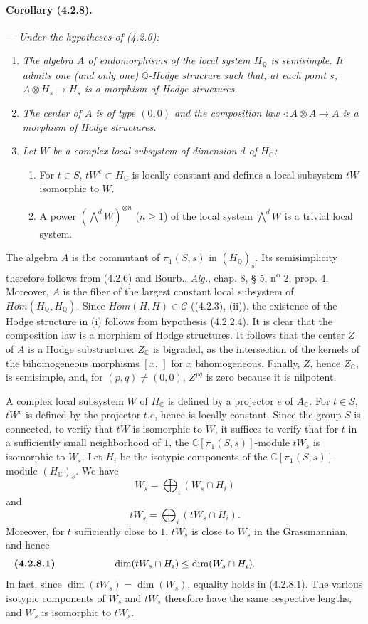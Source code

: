 \documentclass[10pt]{article}
\newcommand{\C}{\mathbb C}
\newcommand{\Q}{\mathbb Q}
\begin{document}
\paragraph{Corollary (4.2.8).} --- {\itshape Under the hypotheses of (4.2.6):}
\begin{enumerate}[label=(\roman*)]
\item {\itshape The algebra $A$ of endomorphisms of the local system $H_\Q$ is semisimple. It admits one (and only one) $\Q$-Hodge structure such that, at each point $s$, $A\otimes H_s\to H_s$ is a morphism of Hodge structures.}
\item {\itshape The center of $A$ is of type $(0,0)$ and the composition law $\cdot : A\otimes A\to A$ is a morphism of Hodge structures.}
\item {\itshape Let $W$ be a complex local subsystem of dimension $d$ of $H_\C$:
\begin{enumerate}[label=\alph*)]
\item For $t\in S$, $tW^c\subset H_\C$ is locally constant and defines a local subsystem $tW$ isomorphic to $W$.
\item A power $(\bigwedge^dW)^{\otimes n}$ ($n\ge1$) of the local system $\bigwedge^dW$ is a trivial local system.
\end{enumerate}}
\end{enumerate}

The algebra $A$ is the commutant of $\pi_1(S,s)$ in $(H_\Q)_s$. Its semisimplicity therefore follows from (4.2.6) and Bourb., \textit{Alg.}, chap. 8, § 5, n\textsuperscript{o} 2, prop. 4. Moreover, $A$ is the fiber of the largest constant local subsystem of $\mathit{Hom}(H_\Q,H_\Q)$. Since $\mathit{Hom}(H,H)\in\mathcal C$ ((4.2.3), (ii)), the existence of the Hodge structure in (i) follows from hypothesis (4.2.2.4). It is clear that the composition law is a morphism of Hodge structures. It follows that the center $Z$ of $A$ is a Hodge substructure: $Z_\C$ is bigraded, as the intersection of the kernels of the bihomogeneous morphisms $[x,\,]$ for $x$ bihomogeneous. Finally, $Z$, hence $Z_\C$, is semisimple, and, for $(p,q)\ne(0,0)$, $Z^{pq}$ is zero because it is nilpotent.

A complex local subsystem $W$ of $H_\C$ is defined by a projector $e$ of $A_\C$. For $t\in S$, $tW^c$ is defined by the projector $t.e$, hence is locally constant. Since the group $S$ is connected, to verify that $tW$ is isomorphic to $W$, it suffices to verify that for $t$ in a sufficiently small neighborhood of $1$, the $\C[\pi_1(S,s)]$-module $tW_s$ is isomorphic to $W_s$. Let $H_i$ be the isotypic components of the $\C[\pi_1(S,s)]$-module $(H_\C)_s$. We have
\[
W_s=\bigoplus_i(W_s\cap H_i)
\]
and
\[
tW_s=\bigoplus_i(tW_s\cap H_i).
\]
Moreover, for $t$ sufficiently close to $1$, $tW_s$ is close to $W_s$ in the Grassmannian, and hence
\[
\makebox[\textwidth][s]{\textbf{(4.2.8.1)}\hfill$\displaystyle \dim(tW_s\cap H_i)\le \dim(W_s\cap H_i).$\hfill\phantom{\textbf{(4.2.8.1)}}}
\]
In fact, since $\dim(tW_s)=\dim(W_s)$, equality holds in (4.2.8.1). The various isotypic components of $W_s$ and $tW_s$ therefore have the same respective lengths, and $W_s$ is isomorphic to $tW_s$.
\end{document}
